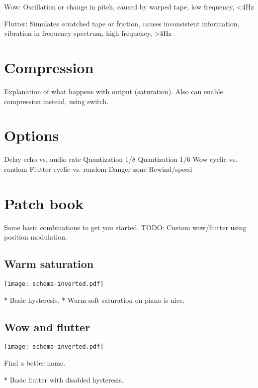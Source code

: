 \documentclass[11pt]{article}
\begin{document}
Wow: Oscillation or change in pitch, caused by warped tape, low frequency, <4Hz

Flutter: Simulates scratched tape or friction, causes inconsistent information, vibration in frequency spectrum, high frequency, >4Hz

\section{Compression}

Explanation of what happens with output (saturation). Also can enable compression instead, using switch.

\section{Options}

Delay echo vs. audio rate
Quantization 1/8
Quantization 1/6
Wow cyclic vs. random
Flutter cyclic vs. random
Danger zone
Rewind/speed

\newpage

\section{Patch book}

Some basic combinations to get you started. TODO: Custom wow/flutter using position modulation.

\vspace{5mm}
\noindent
\begin{minipage}[t]{0.45\textwidth}

\subsection{Warm saturation}

\vspace{5mm}
\begin{center}
  \texttt{[image: schema-inverted.pdf]}
\end{center}

* Basic hysteresis.
* Warm soft saturation on piano is nice.

\end{minipage}%
\begin{minipage}{0.05\textwidth}
\phantom{ }
\end{minipage}%
\begin{minipage}[t]{0.45\textwidth}
\subsection{Wow and flutter}

\vspace{5mm}
\begin{center}
  \texttt{[image: schema-inverted.pdf]}
\end{center}

Find a better name.

* Basic flutter with disabled hysteresis.
\end{minipage}
\end{document}
